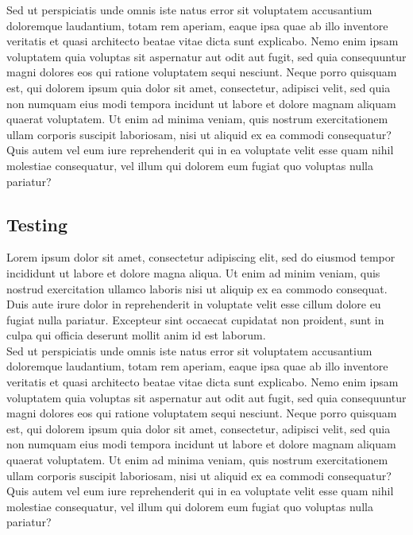 \documentclass[a4paper,12pt]{article}
\theoremstyle{mytheor}
\begin{document}
            \noindent Sed ut perspiciatis unde omnis iste natus error sit voluptatem accusantium doloremque laudantium, totam rem aperiam, eaque ipsa quae ab illo inventore veritatis et quasi architecto beatae vitae dicta sunt explicabo. Nemo enim ipsam voluptatem quia voluptas sit aspernatur aut odit aut fugit, sed quia consequuntur magni dolores eos qui ratione voluptatem sequi nesciunt. Neque porro quisquam est, qui dolorem ipsum quia dolor sit amet, consectetur, adipisci velit, sed quia non numquam eius modi tempora incidunt ut labore et dolore magnam aliquam quaerat voluptatem. Ut enim ad minima veniam, quis nostrum exercitationem ullam corporis suscipit laboriosam, nisi ut aliquid ex ea commodi consequatur? Quis autem vel eum iure reprehenderit qui in ea voluptate velit esse quam nihil molestiae consequatur, vel illum qui dolorem eum fugiat quo voluptas nulla pariatur?
        \subsection{Testing}
            Lorem ipsum dolor sit amet, consectetur adipiscing elit, sed do eiusmod tempor incididunt ut labore et dolore magna aliqua. Ut enim ad minim veniam, quis nostrud exercitation ullamco laboris nisi ut aliquip ex ea commodo consequat. Duis aute irure dolor in reprehenderit in voluptate velit esse cillum dolore eu fugiat nulla pariatur. Excepteur sint occaecat cupidatat non proident, sunt in culpa qui officia deserunt mollit anim id est laborum.\\
                
            \noindent Sed ut perspiciatis unde omnis iste natus error sit voluptatem accusantium doloremque laudantium, totam rem aperiam, eaque ipsa quae ab illo inventore veritatis et quasi architecto beatae vitae dicta sunt explicabo. Nemo enim ipsam voluptatem quia voluptas sit aspernatur aut odit aut fugit, sed quia consequuntur magni dolores eos qui ratione voluptatem sequi nesciunt. Neque porro quisquam est, qui dolorem ipsum quia dolor sit amet, consectetur, adipisci velit, sed quia non numquam eius modi tempora incidunt ut labore et dolore magnam aliquam quaerat voluptatem. Ut enim ad minima veniam, quis nostrum exercitationem ullam corporis suscipit laboriosam, nisi ut aliquid ex ea commodi consequatur? Quis autem vel eum iure reprehenderit qui in ea voluptate velit esse quam nihil molestiae consequatur, vel illum qui dolorem eum fugiat quo voluptas nulla pariatur?
\end{document}
